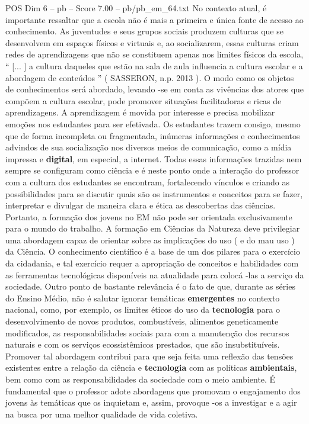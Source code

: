 \begin{textsample}{POS Dim 6 – pb – Score 7.00 – pb/pb\_em\_64.txt}
No contexto atual, é importante ressaltar que a escola não é mais a primeira e única fonte de acesso ao conhecimento.
As juventudes e seus grupos sociais produzem culturas que se desenvolvem em espaços físicos e virtuais e, ao socializarem, essas culturas criam redes de aprendizagens que não se constituem apenas nos limites físicos da escola, “ [... ] a cultura daqueles que estão na sala de aula influencia a cultura escolar e a abordagem de conteúdos ” ( SASSERON, n.p. 2013 ).
O modo como os objetos de conhecimentos será abordado, levando -se em conta as vivências dos atores que compõem a cultura escolar, pode promover situações facilitadoras e ricas de aprendizagens.
A aprendizagem é movida por interesse e precisa mobilizar emoções nos estudantes para ser efetivada.
Os estudantes trazem consigo, mesmo que de forma incompleta ou fragmentada, inúmeras informações e conhecimentos advindos de sua socialização nos diversos meios de comunicação, como a mídia impressa e \textbf{digital}, em especial, a internet.
Todas essas informações trazidas nem sempre se configuram como ciência e é neste ponto onde a interação do professor com a cultura dos estudantes se encontram, fortalecendo vínculos e criando as possibilidades para se discutir quais são os instrumentos e conceitos para se fazer, interpretar e divulgar de maneira clara e ética as descobertas das ciências.
Portanto, a formação dos jovens no EM não pode ser orientada exclusivamente para o mundo do trabalho.
A formação em Ciências da Natureza deve privilegiar uma abordagem capaz de orientar sobre as implicações do uso ( e do mau uso ) da Ciência.
O conhecimento científico é a base de um dos pilares para o exercício da cidadania, e tal exercício requer a apropriação de conceitos e habilidades com as ferramentas tecnológicas disponíveis na atualidade para colocá -las a serviço da sociedade.
Outro ponto de bastante relevância é o fato de que, durante as séries do Ensino Médio, não é salutar ignorar temáticas \textbf{emergentes} no contexto nacional, como, por exemplo, os limites éticos do uso da \textbf{tecnologia} para o desenvolvimento de novos produtos, combustíveis, alimentos geneticamente modificados, as responsabilidades sociais para com a manutenção dos recursos naturais e com os serviços ecossistêmicos prestados, que são insubstituíveis.
Promover tal abordagem contribui para que seja feita uma reflexão das tensões existentes entre a relação da ciência e \textbf{tecnologia} com as políticas \textbf{ambientais}, bem como com as responsabilidades da sociedade com o meio ambiente.
É fundamental que o professor adote abordagens que promovam o engajamento dos jovens às temáticas que os inquietam e, assim, provoque -os a investigar e a agir na busca por uma melhor qualidade de vida coletiva.

\end{textsample}
